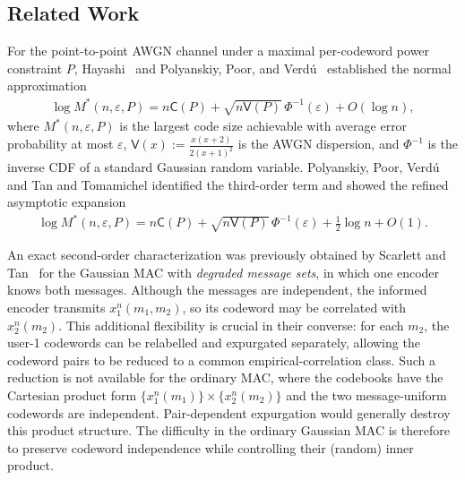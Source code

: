 \documentclass[11pt,onecolumn]{IEEEtran}
\newcommand{\rvC}{\mathsf{C}}
\newcommand{\rvV}{\mathsf{V}}
\newcommand{\eps}{\varepsilon}
\begin{document}
\subsection{Related Work}
For the point-to-point AWGN channel under a maximal per-codeword power constraint
$P$, Hayashi~\cite{Hayashi09} and Polyanskiy, Poor, and
Verd\'u~\cite{PPV10} established the normal approximation
\begin{align}
\log M^*(n,\eps,P)
=
n\rvC(P)
+\sqrt{n\rvV(P)}\,\Phi^{-1}(\eps)
+O(\log n),
\end{align}
where $M^*(n,\eps,P)$ is the largest code size achievable with average error
probability at most $\eps$,
$ \rvV(x):=\frac{x(x+2)}{2(x+1)^2}$ 
is the AWGN dispersion, and $\Phi^{-1}$ is the inverse CDF of a standard
Gaussian random variable. Polyanskiy, Poor, Verd\'u~\cite[Thm.~54]{PPV10} and Tan and Tomamichel \cite{TanTom15} identified the third-order term and showed the refined asymptotic expansion
\begin{align}
\log M^*(n,\eps,P)
=
n\rvC(P)
+\sqrt{n\rvV(P)}\,\Phi^{-1}(\eps)
+\frac12\log n+O(1).
\end{align}

An exact second-order characterization was previously obtained by Scarlett
and Tan~\cite{ST2015} for the Gaussian MAC with {\em  degraded
message sets}, in which one encoder knows both messages. Although the messages
are independent, the informed encoder transmits
$x_1^n(m_1,m_2)$, so its codeword may be correlated with
$x_2^n(m_2)$. This additional flexibility is crucial in their converse: for
each $m_2$, the user-1 codewords can be relabelled and expurgated separately,
allowing the codeword pairs to be reduced to a common empirical-correlation
class. Such a reduction is not available for the ordinary MAC, where the
codebooks have the Cartesian product form
$\{x_1^n(m_1)\}\times\{x_2^n(m_2)\}$ and the two message-uniform codewords
are independent. Pair-dependent expurgation would generally destroy this
product structure. The difficulty in the ordinary Gaussian MAC is therefore
to preserve codeword independence while controlling their (random) inner
product.
\end{document}
